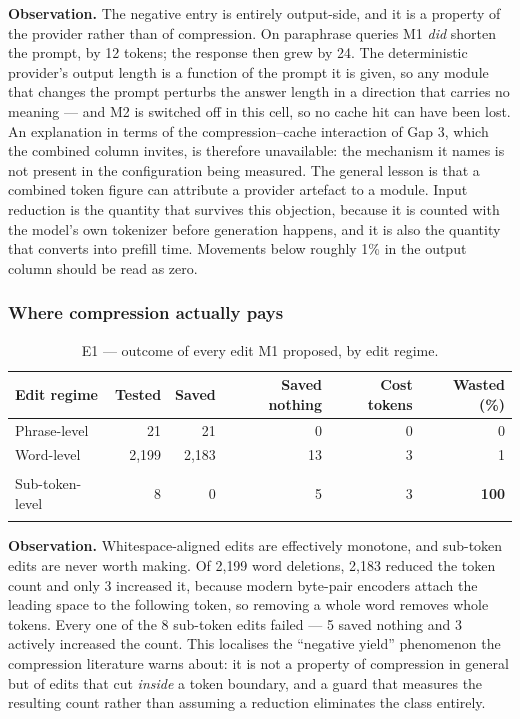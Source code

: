 \documentclass[11pt,a4paper]{article}
\newcommand{\obs}[1]{%
  \par\vspace{2pt}
  \noindent\begin{tcolorbox}[colback=soft,colframe=accent,boxrule=0pt,
    leftrule=2.2pt,arc=0pt,left=7pt,right=5pt,top=4pt,bottom=4pt,breakable]
  \small\textbf{Observation.} #1
  \end{tcolorbox}\par\vspace{2pt}}
\newcommand{\hl}[1]{\colorbox{hlyellow}{\strut #1}}
\begin{document}
\obs{The negative entry is entirely output-side, and it is a property of the
provider rather than of compression. On paraphrase queries M1 \emph{did} shorten
the prompt, by 12 tokens; the response then grew by 24. The deterministic
provider's output length is a function of the prompt it is given, so any module
that changes the prompt perturbs the answer length in a direction that carries no
meaning --- and M2 is switched off in this cell, so no cache hit can have been
lost. An explanation in terms of the compression--cache interaction of Gap 3,
which the combined column invites, is therefore unavailable: the mechanism it
names is not present in the configuration being measured. The general lesson is
that a combined token figure can attribute a provider artefact to a module. Input
reduction is the quantity that survives this objection, because it is counted
with the model's own tokenizer before generation happens, and it is also the
quantity that converts into prefill time. Movements below roughly 1\% in the
output column should be read as zero.}

\subsubsection{Where compression actually pays}

\begin{table}[htbp]
\centering
\caption{E1 --- outcome of every edit M1 proposed, by edit regime.}
\label{tab:tokenprobe}
\footnotesize
\begin{tabular}{@{}l rrrr r@{}}
\toprule
\textbf{Edit regime} & \textbf{Tested} & \textbf{Saved} & \textbf{Saved nothing} &
\textbf{Cost tokens} & \textbf{Wasted (\%)} \\
\midrule
Phrase-level    & 21    & 21    & 0  & 0 & 0 \\
Word-level      & 2{,}199 & 2{,}183 & 13 & 3 & 1 \\
Sub-token-level & 8     & 0     & 5  & 3 & \hl{\textbf{100}} \\
\bottomrule
\end{tabular}
\end{table}

\obs{Whitespace-aligned edits are effectively monotone, and sub-token edits are
never worth making. Of 2{,}199 word deletions, 2{,}183 reduced the token count and
only 3 increased it, because modern byte-pair encoders attach the leading space to
the following token, so removing a whole word removes whole tokens. Every one of
the 8 sub-token edits failed --- 5 saved nothing and 3 actively increased the count.
This localises the ``negative yield'' phenomenon the compression literature warns
about: it is not a property of compression in general but of edits that cut
\emph{inside} a token boundary, and a guard that measures the resulting count
rather than assuming a reduction eliminates the class entirely.}
\end{document}
